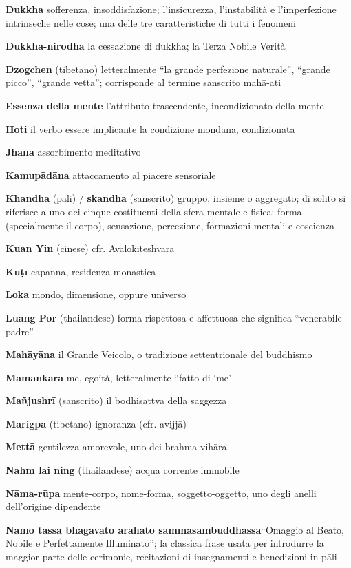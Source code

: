 \textbf{Dukkha }sofferenza, insoddisfazione; l'insicurezza, l'instabilità e l'imperfezione intrinseche nelle cose; una delle tre caratteristiche di tutti i fenomeni

\textbf{Dukkha-nirodha }la cessazione di dukkha; la Terza Nobile Verità

\textbf{Dzogchen} (tibetano) letteralmente ``la grande perfezione naturale'', ``grande picco'', ``grande vetta''; corrisponde al termine sanscrito mahā-ati

\textbf{Essenza della mente }l'attributo trascendente, incondizionato della mente

\textbf{Hoti }il verbo essere implicante la condizione mondana, condizionata

\textbf{Jhāna }assorbimento meditativo

\textbf{Kamupādāna }attaccamento al piacere sensoriale

\textbf{Khandha} (pāli) / \textbf{skandha} (sanscrito) gruppo, insieme o aggregato; di solito si riferisce a uno dei cinque costituenti della sfera mentale e fisica: forma (specialmente il corpo), sensazione, percezione, formazioni mentali e coscienza

\textbf{Kuan Yin} (cinese) cfr. Avalokiteshvara

\textbf{Ku}\textbf{ṭ}\textbf{ī }capanna, residenza monastica

\textbf{Loka }mondo, dimensione, oppure universo

\textbf{Luang Por} (thailandese) forma rispettosa e affettuosa che significa ``venerabile padre''

\textbf{Mahāyāna }il Grande Veicolo, o tradizione settentrionale del buddhismo

\textbf{Mamankāra }me, egoità, letteralmente ``fatto di `me'

\textbf{Mañjushrī} (sanscrito) il bodhisattva della saggezza

\textbf{Marigpa} (tibetano) ignoranza (cfr. avijjā)

\textbf{Mettā }gentilezza amorevole, uno dei brahma-vihāra

\textbf{Nahm lai ning} (thailandese) acqua corrente immobile 

\textbf{Nāma-rūpa }mente-corpo, nome-forma, soggetto-oggetto, uno degli anelli dell'origine dipendente

\textbf{Namo tassa bhagavato arahato sammāsambuddhassa}``Omaggio al Beato, Nobile e Perfettamente Illuminato''; la classica frase usata per introdurre la maggior parte delle cerimonie, recitazioni di insegnamenti e benedizioni in pāli


